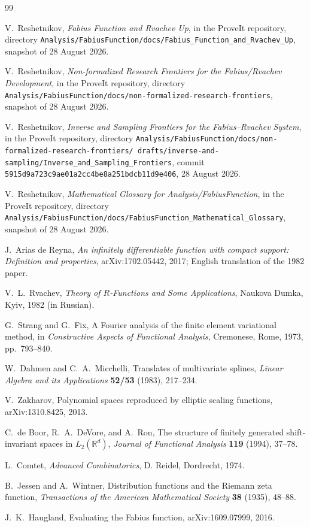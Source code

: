 \documentclass[11pt,oneside]{article}
\theoremstyle{definition}
\theoremstyle{remark}
\newcommand{\R}{\mathbb R}
\begin{document}
\begin{thebibliography}{99}

V.~Reshetnikov,
\emph{Fabius Function and Rvachev Up},
in the ProveIt repository, directory
\texttt{Analysis/FabiusFunction/docs/Fabius\_Function\_and\_Rvachev\_Up},
snapshot of 28 August 2026.

V.~Reshetnikov,
\emph{Non-formalized Research Frontiers for the Fabius/Rvachev Development},
in the ProveIt repository, directory
\texttt{Analysis/FabiusFunction/docs/non-formalized-research-frontiers},
snapshot of 28 August 2026.

V.~Reshetnikov,
\emph{Inverse and Sampling Frontiers for the Fabius--Rvachev System},
in the ProveIt repository, directory
\texttt{Analysis/FabiusFunction/docs/non-formalized-research-frontiers/
 drafts/inverse-and-sampling/Inverse\_and\_Sampling\_Frontiers},
commit \texttt{5915d9a723c9ae01a2cc4be8a251bdcb11d9e406}, 28 August 2026.

V.~Reshetnikov,
\emph{Mathematical Glossary for Analysis/FabiusFunction},
in the ProveIt repository, directory
\texttt{Analysis/FabiusFunction/docs/FabiusFunction\_Mathematical\_Glossary},
snapshot of 28 August 2026.

J.~Arias de Reyna,
\emph{An infinitely differentiable function with compact support: Definition
and properties},
arXiv:1702.05442, 2017; English translation of the 1982 paper.

V.~L.~Rvachev,
\emph{Theory of \(R\)-Functions and Some Applications},
Naukova Dumka, Kyiv, 1982 (in Russian).

G.~Strang and G.~Fix,
A Fourier analysis of the finite element variational method,
in \emph{Constructive Aspects of Functional Analysis},
Cremonese, Rome, 1973, pp.~793--840.

W.~Dahmen and C.~A.~Micchelli,
Translates of multivariate splines,
\emph{Linear Algebra and its Applications} \textbf{52/53} (1983),
217--234.

V.~Zakharov,
Polynomial spaces reproduced by elliptic scaling functions,
arXiv:1310.8425, 2013.

C.~de Boor, R.~A.~DeVore, and A.~Ron,
The structure of finitely generated shift-invariant spaces in
\(L_2(\R^d)\),
\emph{Journal of Functional Analysis} \textbf{119} (1994), 37--78.

L.~Comtet,
\emph{Advanced Combinatorics},
D. Reidel, Dordrecht, 1974.

B.~Jessen and A.~Wintner,
Distribution functions and the Riemann zeta function,
\emph{Transactions of the American Mathematical Society}
\textbf{38} (1935), 48--88.

J.~K.~Haugland,
Evaluating the Fabius function,
arXiv:1609.07999, 2016.

\end{thebibliography}
\end{document}
